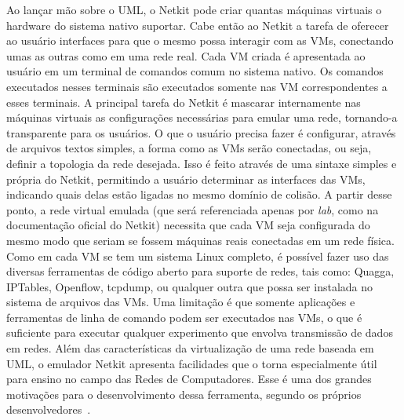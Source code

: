 \documentclass[	12pt, Times, openright, twoside, a4paper, english, brazil]{abntex2}
\begin{document}
Ao lançar mão sobre o UML, o Netkit pode criar quantas máquinas virtuais o hardware do sistema nativo suportar. Cabe então ao Netkit a tarefa de oferecer ao usuário interfaces para que o mesmo possa interagir com as VMs, conectando umas as outras como em uma rede real. Cada VM criada é apresentada ao usuário em um terminal de comandos comum no sistema nativo. Os comandos executados nesses terminais são executados somente nas VM correspondentes a esses terminais. A principal tarefa do Netkit é mascarar internamente nas máquinas virtuais as configurações necessárias para emular uma rede, tornando-a transparente para os usuários. O que o usuário precisa fazer é configurar, através de arquivos textos simples, a forma como as VMs serão conectadas, ou seja, definir a topologia da rede desejada. Isso é feito através de uma sintaxe simples e própria do Netkit, permitindo a usuário determinar as interfaces das VMs, indicando quais delas estão ligadas no mesmo domínio de colisão. A partir desse ponto, a rede virtual emulada (que será referenciada apenas por \textit{lab}, como na documentação oficial do Netkit) necessita que cada VM seja configurada do mesmo modo que seriam se fossem máquinas reais conectadas em um rede física. Como em cada VM se tem um sistema Linux completo, é possível fazer uso das diversas ferramentas de código aberto para suporte de redes, tais como: Quagga, IPTables, Openflow, tcpdump, ou qualquer outra que possa ser instalada no sistema de arquivos das VMs. Uma limitação é que somente aplicações e ferramentas de linha de comando podem ser executados nas VMs, o que é suficiente para executar qualquer experimento que envolva transmissão de dados em redes. Além das características da virtualização de uma rede baseada em UML, o emulador Netkit apresenta facilidades que o torna especialmente útil para ensino no campo das Redes de Computadores. Esse é uma dos grandes motivações para o desenvolvimento dessa ferramenta, segundo os próprios desenvolvedores~\cite{Pizzonia}.
\end{document}
